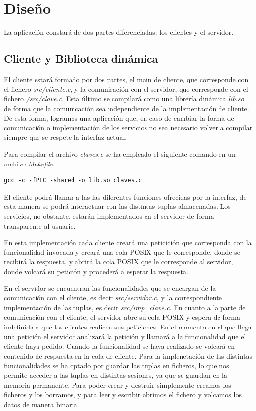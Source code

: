 \documentclass[]{article}
\begin{document}
\section{Diseño}
\label{sec:disenno}
La aplicación constará de dos partes diferenciadas: los clientes y el servidor.

\subsection{Cliente y Biblioteca dinámica}
\label{subsec:cliente_biblioteca}
El cliente estará formado por dos partes, el main de cliente, que corresponde con el fichero \textit{src/cliente.c}, y la comunicación con el servidor, que corresponde con el fichero \textit{/src/clave.c}. Esta último se compilará como una librería dinámica \textit{lib.so} de forma que la comunicación sea independiente de la implementación de cliente. De esta forma, logramos una aplicación que, en caso de cambiar la forma de comunicación o implementación de los servicios no sea necesario volver a compilar siempre que se respete la interfaz actual. 

Para compilar el archivo \textit{claves.c} se ha empleado el siguiente comando en un archivo \textit{Makefile}.

\begin{center}
\begin{lstlisting}[caption=Compiación de biblioteca dinámica]
gcc -c -fPIC -shared -o lib.so claves.c
\end{lstlisting}
\end{center}

El  cliente podrá llamar a las  las diferentes funciones ofrecidas por la interfaz, de esta manera se podrá interactuar con las distintas tuplas almacenadas. Los servicios, no obstante,  estarán implementados en el servidor de forma transparente al usuario.

En esta implementación cada cliente creará una peticición que corresponda con la funcionalidad invocada y creará una cola POSIX que le corresponde, donde se recibirá la respuesta, y abrirá la cola POSIX que le corresponde al servidor, donde volcará su petición y procederá a esperar la respuesta.

En el servidor se encuentran las funcionalidades que se encargan de la comunicación con el cliente, es decir \textit{src/servidor.c}, y la correspondiente implementación de las tuplas, es decir \textit{src/imp\_clave.c}.
En cuanto a la parte de comunicación con el cliente, el servidor abre su cola POSIX y espera de forma indefinida a que los clientes realicen sus peticiones. En el momento en el que llega una petición el servidor analizará la petición y llamará a la funcionalidad que el cliente haya pedido. Cuando la funcionalidad se haya realizado se volcará en contenido de respuesta en la cola de cliente.
Para la implenetación de las distintas funcionalidades se ha optado por guardar las tuplas en ficheros, lo que nos permite acceder a las tuplas en distintas sesiones, ya que se guardan en la memoria permanente.
Para poder crear y destruir simplemente creamos los ficheros y los borramos, y para leer y escribir abrimos el fichero y volcamos los datos de manera binaria.
\end{document}
